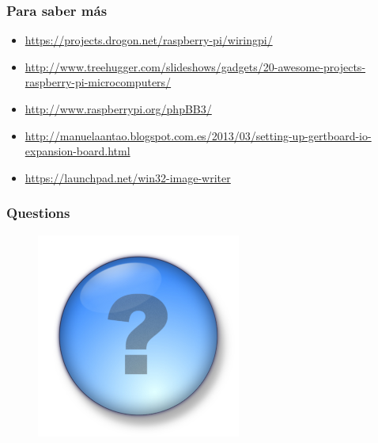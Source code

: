 \documentclass[10pt,colorlinks]{beamer}
\begin{document}
\begin{frame}[fragile]\frametitle{Para saber más}

\begin{itemize}
    \item \href{https://projects.drogon.net/raspberry-pi/wiringpi/}{https://projects.drogon.net/raspberry-pi/wiringpi/}
    \item \href{http://www.treehugger.com/slideshows/gadgets/20-awesome-projects-raspberry-pi-microcomputers/}{http://www.treehugger.com/slideshows/gadgets/20-awesome-projects-raspberry-pi-microcomputers/}
    \item \href{http://www.raspberrypi.org/phpBB3/}{http://www.raspberrypi.org/phpBB3/}
    \item \href{http://manuelaantao.blogspot.com.es/2013/03/setting-up-gertboard-io-expansion-board.html}{http://manuelaantao.blogspot.com.es/2013/03/setting-up-gertboard-io-expansion-board.html}
    \item \href{https://launchpad.net/win32-image-writer}{https://launchpad.net/win32-image-writer}
\end{itemize}
\end{frame}


\begin{frame}\frametitle{Questions}
\begin{figure}[!htb]
    \centering
    \includegraphics[width=0.6\textwidth]{figs/question_mark}
\end{figure}
\end{frame}
\end{document}
